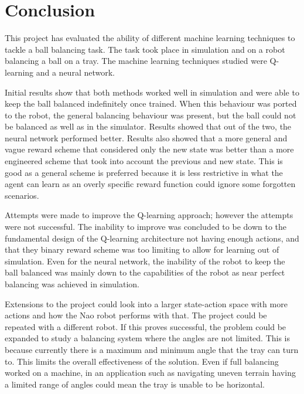 \documentclass[12pt,a4paper]{article}
\begin{document}
\section{Conclusion}

This project has evaluated the ability of different machine learning techniques to tackle a ball balancing task. The task took place in simulation and on a robot balancing a ball on a tray. The machine learning techniques studied were Q-learning and a neural network. 

Initial results show that both methods worked well in simulation and were able to keep the ball balanced indefinitely once trained. When this behaviour was ported to the robot, the general balancing behaviour was present, but the ball could not be balanced as well as in the simulator. Results showed that out of the two, the neural network performed better. Results also showed that a more general and vague reward scheme that considered only the new state was better than a more engineered scheme that took into account the previous and new state. This is good as a general scheme is preferred because it is less restrictive in what the agent can learn as an overly specific reward function could ignore some forgotten scenarios.

Attempts were made to improve the Q-learning approach; however the attempts were not successful. The inability to improve was concluded to be down to the fundamental design of the Q-learning architecture not having enough actions, and that they binary reward scheme was too limiting to allow for learning out of simulation. Even for the neural network, the inability of the robot to keep the ball balanced was mainly down to the capabilities of the robot as near perfect balancing was achieved in simulation. 

Extensions to the project could look into a larger state-action space with more actions and how the Nao robot performs with that. The project could be repeated with a different robot. If this proves successful, the problem could be expanded to study a balancing system where the angles are not limited. This is because currently there is a maximum and minimum angle that the tray can turn to. This limits the overall effectiveness of the solution. Even if full balancing worked on a machine, in an application such as navigating uneven terrain having a limited range of angles could mean the tray is unable to be horizontal. 


\end{document}
